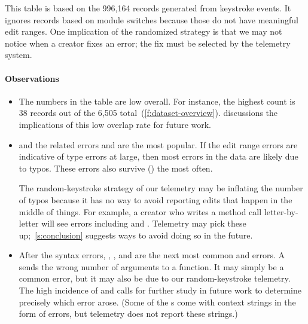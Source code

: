 \documentclass[english,submission,cleveref]{programming}
\begin{document}
This table is based on the 996,164 records generated from keystroke events.
It ignores records based on module switches because those do not have
meaningful edit ranges.
One implication of the randomized strategy is that we may not notice
when a creator fixes an error; the fix must be selected by the
telemetry system.


\paragraph{Observations}

\begin{itemize}
  \item
    The numbers in the table are low overall.
    For instance, the highest \mstrict{} count is 38
    records out of the 6,505 total~(\cref{f:dataset-overview}).
     discussions the implications
    of this low overlap rate for future work.

  \item
     and the related errors  and
     are the most popular.
    If the edit range errors are indicative of type errors at large,
    then most errors in the data are likely due to typos.
    These errors also survive (\keepsym{}) the most often.

    \subitem The random-keystroke strategy of our telemetry may be inflating
    the number of typos because it has no way to avoid reporting edits that
    happen in the middle of things.
    For example, a creator who writes a method call
     letter-by-letter will see errors
    including  and .
    Telemetry may pick these up;~\cref{s:conclusion} suggests ways
    to avoid doing so in the future.

  \item
    After the syntax errors, , , and
     are the next most common \mnonstrict{} and \mstrict{}
    errors.
    A  sends the wrong number of arguments to a function.
    It may simply be a common error, but it may also be due to our random-keystroke
    telemetry.
    The high incidence of  and  calls for
    further study in future work to determine precisely which error arose.
    (Some of the s come with context strings in the form of
     errors, but telemetry does not report these strings.)


\end{itemize}
\end{document}
